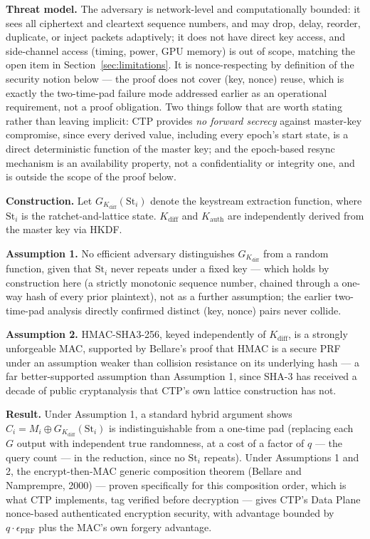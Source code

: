 \documentclass[twocolumn,10pt,journal,compsoc]{IEEEtran}
\begin{document}
\textbf{Threat model.} The adversary is network-level and computationally bounded: it sees all ciphertext and cleartext sequence numbers, and may drop, delay, reorder, duplicate, or inject packets adaptively; it does not have direct key access, and side-channel access (timing, power, GPU memory) is out of scope, matching the open item in Section~\ref{sec:limitations}. It is nonce-respecting by definition of the security notion below --- the proof does not cover (key, nonce) reuse, which is exactly the two-time-pad failure mode addressed earlier as an operational requirement, not a proof obligation. Two things follow that are worth stating rather than leaving implicit: CTP provides \emph{no forward secrecy} against master-key compromise, since every derived value, including every epoch's start state, is a direct deterministic function of the master key; and the epoch-based resync mechanism is an availability property, not a confidentiality or integrity one, and is outside the scope of the proof below.

\textbf{Construction.} Let $G_{K_{\text{diff}}}(\text{St}_i)$ denote the keystream extraction function, where $\text{St}_i$ is the ratchet-and-lattice state. $K_{\text{diff}}$ and $K_{\text{auth}}$ are independently derived from the master key via HKDF.

\textbf{Assumption 1.} No efficient adversary distinguishes $G_{K_{\text{diff}}}$ from a random function, given that $\text{St}_i$ never repeats under a fixed key --- which holds by construction here (a strictly monotonic sequence number, chained through a one-way hash of every prior plaintext), not as a further assumption; the earlier two-time-pad analysis directly confirmed distinct (key, nonce) pairs never collide.

\textbf{Assumption 2.} HMAC-SHA3-256, keyed independently of $K_{\text{diff}}$, is a strongly unforgeable MAC, supported by Bellare's proof that HMAC is a secure PRF under an assumption weaker than collision resistance on its underlying hash --- a far better-supported assumption than Assumption 1, since SHA-3 has received a decade of public cryptanalysis that CTP's own lattice construction has not.

\textbf{Result.} Under Assumption 1, a standard hybrid argument shows $C_i = M_i \oplus G_{K_{\text{diff}}}(\text{St}_i)$ is indistinguishable from a one-time pad (replacing each $G$ output with independent true randomness, at a cost of a factor of $q$ --- the query count --- in the reduction, since no $\text{St}_i$ repeats). Under Assumptions 1 and 2, the encrypt-then-MAC generic composition theorem (Bellare and Namprempre, 2000) --- proven specifically for this composition order, which is what CTP implements, tag verified before decryption --- gives CTP's Data Plane nonce-based authenticated encryption security, with advantage bounded by $q \cdot \epsilon_{\text{PRF}}$ plus the MAC's own forgery advantage.
\end{document}
